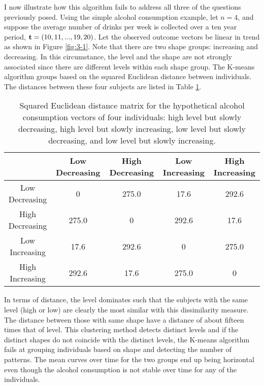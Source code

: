 I now illustrate how this algorithm fails to address all three of the questions previously posed. Using the simple alcohol consumption example, let $n=4$, and suppose the average number of drinks per week is collected over a ten year period, $\mathbf t=(10,11,...,19,20)$. Let the observed outcome vectors be linear in trend as shown in Figure \ref{fig:3-1}. Note that there are two shape groups: increasing and decreasing. In this circumstance, the level and the shape are not strongly associated since there are different levels within each shape group. The K-means algorithm groups based on the squared Euclidean distance between individuals. The distances between these four subjects are listed in Table \ref{tab:3-1}. 
\begin{table}[h]
\begin{center}
\begin{tabular}{c|cccc}
&Low Decreasing& High Decreasing&Low Increasing&High Increasing\\
\hline
Low Decreasing&0&275.0&17.6&292.6\\
High Decreasing&275.0  &0 &  292.6 &17.6 \\                     
Low Increasing& 17.6 &292.6  &0   &275.0   \\          
High Increasing& 292.6 &17.6 &275.0   &0 
\end{tabular}
\end{center}
\caption{Squared Euclidean distance matrix for the hypothetical alcohol consumption vectors of four individuals: high level but slowly decreasing, high level but slowly increasing, low level but slowly decreasing, and low level but slowly increasing. }
\label{tab:3-1}
\end{table}

In terms of distance, the level dominates such that the subjects with the same level (high or low) are clearly the most similar with this dissimilarity measure. The distance between those with same shape have a distance of about fifteen times that of level. This clustering method detects distinct levels and if the distinct shapes do not coincide with the distinct levels, the K-means algorithm fails at grouping individuals based on shape and detecting the number of patterns. The mean curves over time for the two groups end up being horizontal even though the alcohol consumption is not stable over time for any of the individuals.

